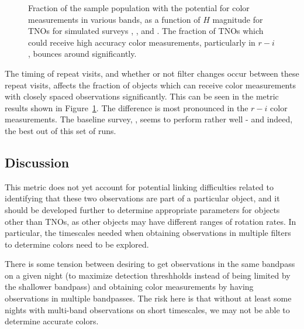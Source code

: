 \begin{figure}
\caption{Fraction of the sample population with the potential for
  color measurements in various bands, as a function of $H$ magnitude
  for TNOs for simulated surveys ,
  , 
  and . The fraction of TNOs which
  could receive high accuracy color measurements, particularly in
  $r-i$, bounces around significantly.
\label{colordetermination}}
\end{figure}

The timing of repeat visits, and whether or not filter changes occur
between these repeat visits, affects the fraction of objects which can
receive color measurements with closely spaced observations
significantly. This can be seen in the metric results shown in
Figure~\ref{colordetermination}. The difference is most pronounced in
the $r-i$ color measurements. The baseline survey,
, seems to perform rather well - and
indeed, the best out of this set of runs. 



\subsection{Discussion}
\label{sec:\secname:discussion}

This metric does not yet account for potential linking difficulties
related to identifying that these two observations are part of a
particular object, and it should be developed further to determine
appropriate parameters for objects other than TNOs, as other objects
may have different ranges of rotation rates. In particular, the
timescales needed when obtaining observations in multiple filters to
determine colors need to be explored.

There is some tension between desiring to get observations in the same
bandpass on a given night (to maximize detection threshholds instead
of being limited by the shallower bandpass) and obtaining color
measurements by having observations in multiple bandpasses. The risk
here is that without at least some nights with multi-band observations
on short timescales, we may not be able to determine accurate colors.

\navigationbar

%
%

